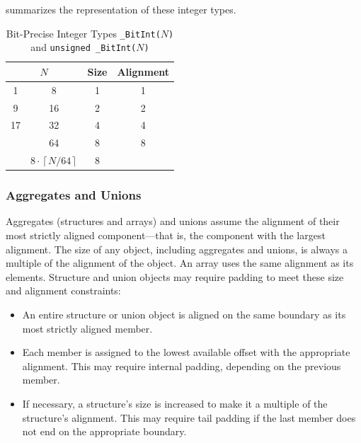 \documentclass[USenglish,fontsize=11pt,twoside,%
  toc=bib,toc=idx,toc=graduated,numbers=noendperiod,
  bookmarks=true,
  bookmarksnumbered=true,
  bookmarksopen=true,
  bookmarksopenlevel=1,
  breaklinks=true,
  colorlinks=true,
  linkcolor=black,
  pdfpagelayout={TwoPageRight},
  pdfusetitle=true
]{scrreprt}
\newcommand{\NBITS}{64}
\newcommand{\NBYTES}{8}
\newcommand{\NBITS}{32}
\newcommand{\NBYTES}{4}
\newenvironment{DIFnomarkup}{}{} %
\begin{document}
 summarizes the representation of these integer types.

\begin{table}
  \centering
  \begin{DIFnomarkup}
  \begin{tabular}[t]{c@{\,\ldots\,}ccc}
    \toprule
    \multicolumn{2}{c}{$N$} & Size & Alignment \\
    \midrule
     1 &   8 &  1 & 1 \\
     9 &  16 &  2 & 2 \\
    17 &  32 &  4 & 4 \\
    \ifzseries
    33 &  64 &  8 & 8 \\
    \fi
    \multicolumn{2}{c}{$>\NBITS{}$}
                            & $\NBYTES{}\cdot\left\lceil N/\NBITS\right\rceil$
                                   & \NBYTES{} \\
    \bottomrule
  \end{tabular}
  \end{DIFnomarkup}
  \caption[Bit-Precise Integer Types] {Bit-Precise Integer Types
    \texttt{\_BitInt($N$)} and \texttt{unsigned \_BitInt($N$)}}
  \label{tab:bitint}
\end{table}

\subsubsection{Aggregates and Unions}
Aggregates
(structures and arrays) and
unions assume the
alignment of their most strictly
aligned component---that is, the component with the largest alignment.
The size of any object, including
aggregates and unions, is always a multiple of the alignment of the
object.  An array uses the same alignment as its elements.  Structure and
union objects may require padding to meet these size and alignment
constraints:

\begin{itemize}
\item An entire structure or union object is aligned on the same
  boundary as its most strictly aligned member.
\item Each member is assigned to the lowest available offset with the
  appropriate alignment.  This may require internal
  padding, depending on the previous member.
\item If necessary, a structure's size is increased to make it a
  multiple of the structure's alignment.  This may require tail padding
  if the last member does not end on the appropriate boundary.
\end{itemize}
\end{document}
